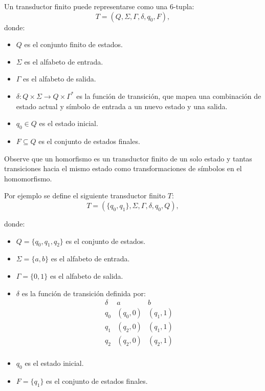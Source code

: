 Un transductor finito puede representarse como una 6-tupla:
\[
      T = (Q, \Sigma, \Gamma, \delta, q_0, F),
\]
donde:
\begin{itemize}
      \item \(Q\) es el conjunto finito de estados.
      \item \(\Sigma\) es el alfabeto de entrada.
      \item \(\Gamma\) es el alfabeto de salida.
      \item \(\delta: Q \times \Sigma \to Q \times \Gamma^*\) es la función de transición, que mapea una combinación de estado actual y símbolo de entrada a un nuevo estado y una salida.
      \item \(q_0 \in Q\) es el estado inicial.
      \item \(F \subseteq Q\) es el conjunto de estados finales.
\end{itemize}

Observe que un homorfismo es un transductor finito de un solo estado y tantas transiciones hacia el mismo estado como transformaciones
de símbolos en el homomorfismo.

Por ejemplo se define el siguiente transductor finito $T$:
\[
      T = (\{q_0, q_1\}, \Sigma, \Gamma, \delta, q_0, Q),
\]

donde:

\begin{itemize}
      \item \(Q = \{q_0, q_1, q_2\}\) es el conjunto de estados.
      \item \(\Sigma = \{a, b\}\) es el alfabeto de entrada.
      \item \(\Gamma = \{0, 1\}\) es el alfabeto de salida.
      \item \(\delta\) es la función de transición definida por:
            \[
                  \begin{array}{c|c|c}
                        \delta & a        & b        \\
                        \hline
                        q_0    & (q_0, 0) & (q_1, 1) \\
                        q_1    & (q_2, 0) & (q_1, 1) \\
                        q_2    & (q_2, 0) & (q_2, 1) \\
                  \end{array}
            \]
      \item \(q_0\) es el estado inicial.
      \item \(F = \{q_1\}\) es el conjunto de estados finales.
\end{itemize}

